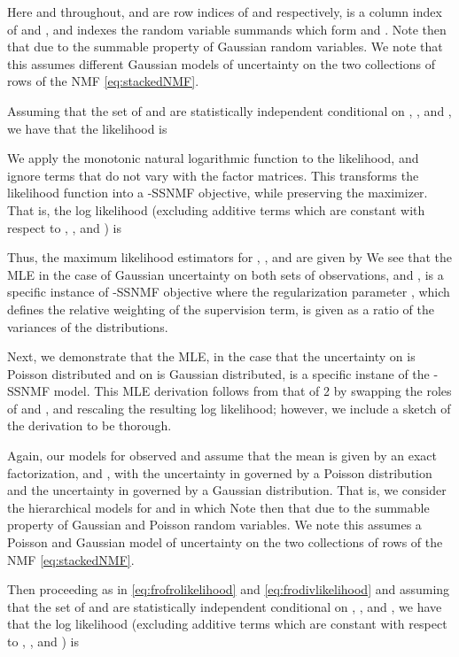 \documentclass[twocolumn,10pt]{article}
\begin{document}
Here and throughout,  and  are row indices of  and  respectively,  is a column index of  and , and  indexes the random variable summands which form  and . Note then that   due to the summable property of Gaussian random variables.  We note that this assumes different Gaussian models of uncertainty on the two collections of rows of the NMF \eqref{eq:stackedNMF}.  

Assuming that the set of  and  are statistically independent conditional on , , and , we have that the likelihood  is 

{\footnotesize }\normalsize

\noindent We apply the monotonic natural logarithmic function to the likelihood, and ignore terms that do not vary with the factor matrices.  This transforms the likelihood function into a -SSNMF objective, while preserving the maximizer.
That is, the log likelihood (excluding additive terms which are constant with respect to , , and ) is 

{\footnotesize }Thus, the maximum likelihood estimators for , , and  are given by 
  We see that the MLE in the case of Gaussian uncertainty on both sets of observations,  and , is a specific instance of -SSNMF objective where the regularization parameter , which defines the relative weighting of the supervision term, is given as a ratio of the variances of the distributions.

Next, 
we demonstrate that the MLE, in the case that the uncertainty on  is Poisson distributed and on  is Gaussian distributed, is a specific instane of the -SSNMF model. This MLE derivation follows from that of 2 by swapping the roles of  and , and rescaling the resulting log likelihood; however, we include a sketch of the derivation to be thorough.  

Again, our models for observed  and  assume that the mean is given by an exact factorization,  and , with the uncertainty in  governed by a Poisson distribution and the uncertainty in  governed by a Gaussian distribution.  That is, we consider the hierarchical models for  and  in which  
 Note then that   due to the summable property of Gaussian and Poisson random variables.  We note this assumes a Poisson and Gaussian model of uncertainty on the two collections of rows of the NMF \eqref{eq:stackedNMF}. 

Then proceeding as in \eqref{eq:frofrolikelihood} and \eqref{eq:frodivlikelihood} and assuming that the set of  and  are statistically independent conditional on , , and , we have that the 
log likelihood (excluding additive terms which are constant with respect to , , and ) is 
\end{document}
